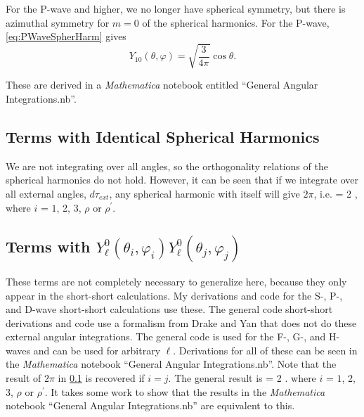 \documentclass[Dissertation.tex]{subfiles}
\begin{document}
For the P-wave and higher, we no longer have spherical symmetry, but there is
azimuthal symmetry for $m = 0$ of the spherical harmonics. For the P-wave,
\cref{eq:PWaveSpherHarm} gives
\begin{equation}
Y_{10}(\theta,\varphi) = \sqrt{\frac{3}{4\pi}} \cos\theta.
\end{equation}






These are derived in a \emph{Mathematica} notebook entitled ``General Angular Integrations.nb''.



\subsection{Terms with Identical Spherical Harmonics}
\label{sec:AngSame}
We are not integrating over all angles, so the orthogonality relations of the
spherical harmonics do not hold. However, it can be seen that if we integrate
over all external angles, $d\tau_{ext}$, any spherical harmonic with itself
will give $2\pi$, i.e.
\beq
\label{eq:AngSame}
 = 2 \pi,
\eeq
where $i$ = $1$, 2, 3, $\rho$ or $\rho^\prime$.


\subsection{Terms with \texorpdfstring{$Y_\ell^0(\theta_i, \varphi_i) Y_\ell^0(\theta_j, \varphi_j)$}{Yi-Yj} }
\label{sec:AngRiRj}

These terms are not completely necessary to generalize here, because they 
only appear in the short-short calculations. My derivations and code for the 
S-, P-, and D-wave short-short calculations use these. The general code
short-short derivations and code \cite{sec:} use a formalism from Drake and
Yan \cite{Yan1997} that does not do these external angular integrations. The 
general code is used for the F-, G-, and H-waves and can be used for 
arbitrary $\ell$. Derivations for all of these can be seen in the
\emph{Mathematica} notebook ``General Angular Integrations.nb''. Note that the
result of $2\pi$ in \cref{sec:AngSame} is recovered if $i=j$. The general 
result is
\beq
\label{eq:AngRiRj}
 = 2 \pi {}.
\eeq
where $i$ = $1$, 2, 3, $\rho$ or $\rho^\prime$. It takes some work to show that the results in the \emph{Mathematica} notebook ``General Angular Integrations.nb'' are equivalent to this.
\end{document}
